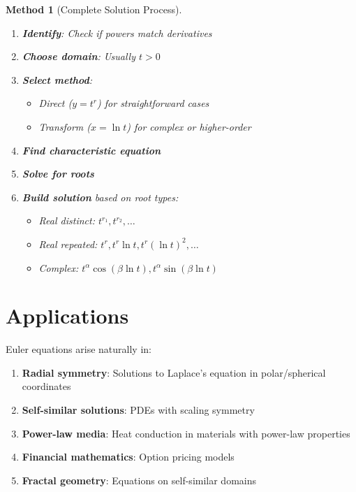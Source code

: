 \documentclass[12pt]{article}
\newtheorem{method}{Method}
\begin{document}
\begin{method}[Complete Solution Process]
\begin{enumerate}
    \item \textbf{Identify}: Check if powers match derivatives
    \item \textbf{Choose domain}: Usually $t > 0$
    \item \textbf{Select method}:
    \begin{itemize}
        \item Direct ($y = t^{r}$) for straightforward cases
        \item Transform ($x = \ln t$) for complex or higher-order
    \end{itemize}
    \item \textbf{Find characteristic equation}
    \item \textbf{Solve for roots}
    \item \textbf{Build solution} based on root types:
    \begin{itemize}
        \item Real distinct: $t^{r_{1}}, t^{r_{2}}, \ldots$
        \item Real repeated: $t^{r}, t^{r}\ln t, t^{r}(\ln t)^{2}, \ldots$
        \item Complex: $t^\alpha\cos(\beta\ln t), t^\alpha\sin(\beta\ln t)$
    \end{itemize}
\end{enumerate}
\end{method}

\section{Applications}

\begin{insight}
Euler equations arise naturally in:
\begin{enumerate}
    \item \textbf{Radial symmetry}: Solutions to Laplace's equation in polar/spherical coordinates
    \item \textbf{Self-similar solutions}: PDEs with scaling symmetry
    \item \textbf{Power-law media}: Heat conduction in materials with power-law properties
    \item \textbf{Financial mathematics}: Option pricing models
    \item \textbf{Fractal geometry}: Equations on self-similar domains
\end{enumerate}
\end{insight}
\end{document}
